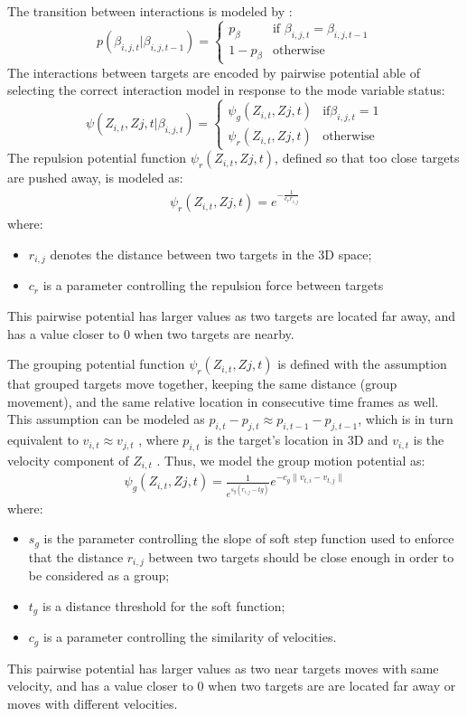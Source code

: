 The transition between interactions is modeled by :
$$
 p(\beta_{i,j,t} |\beta_{i,j,t-1} )= \left\{
\begin{array}{rl}
 p_{\beta}  & \mbox{if } \beta_{i,j,t} = \beta_{i,j,t-1}  \\
 1- p_{\beta} & \mbox{otherwise}
\end{array}
\right.
$$
The interactions between targets are encoded by pairwise potential able of selecting
the correct interaction model in response to the mode variable status:
$$
\psi(Z_{i,t} , Z{j,t} | \beta_{i,j,t} )= \left\{
\begin{array}{rl}
 \psi_g(Z_{i,t} , Z{j,t}) & \mbox{if} \beta_{i,j,t}=1	 \\
 \psi_r(Z_{i,t} , Z{j,t}) & \mbox{otherwise}
\end{array}
\right.
$$
The repulsion potential function  $\psi_r(Z_{i,t} , Z{j,t})$, defined so that
too close targets are pushed away, is modeled as:
\begin{eqnarray}\label{eqn: transition factorized 2}
\psi_r(Z_{i,t} , Z{j,t}) = e^{-\frac{1}{c_r r_{i,j}}}
\end{eqnarray}
where:
\begin{itemize}
\item $r_{i,j}$ denotes the distance between two targets in the 3D space;
\item $c_r$ is a parameter controlling the repulsion force between targets
\end{itemize}
This pairwise potential has larger values as two targets are located far away, and has a value closer to $0$ when two targets are nearby.

The  grouping potential function $\psi_r(Z_{i,t} , Z{j,t})$  is defined with the assumption that grouped targets move together, keeping the same distance (group movement), and the same relative location in consecutive time frames as well. This assumption can be modeled as $p_{i,t} − p_{j,t} \approx p_{i,t-1} - p_{j,t-1}$, which is in turn equivalent to $v_{i,t} \approx v_{j,t}$ , where $p_{i,t}$ is the target’s location in 3D and $v_{i,t}$ is the velocity component of $Z_{i,t}$ .
Thus, we model the group motion potential as:
\begin{eqnarray} \label{eqn: group motion potential}
\psi_g(Z_{i,t} , Z{j,t}) = \frac{1}{e^{s_g(r_{i,j}-tg)} } e^{-c_g \| v_{t,i}-v_{t,j} \|} 
\end{eqnarray}
where:
\begin{itemize}
\item $s_g$ is the parameter controlling the slope of soft step function
used to enforce that the distance $r_{i,j}$ between two targets should be close enough in order to be considered as a group;
\item $t_g$ is a distance threshold for the soft function;
\item $c_g$ is a parameter controlling the similarity of velocities.
\end{itemize}
This pairwise potential has larger values as two near targets moves with same velocity, and has a value closer to $0$ when two targets are are located far away or moves with different velocities.


